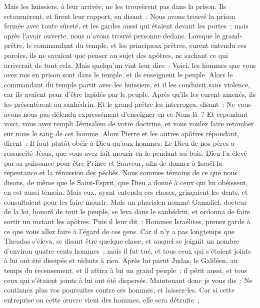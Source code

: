 \begin{multicols}{2}
Mais les huissiers, à leur arrivée, ne les trouvèrent pas dans la prison. Ils retournèrent, et firent leur rapport,
en disant~: Nous avons trouvé la prison fermée avec toute sûreté, et les gardes aussi qui étaient devant les portes~; mais après l'avoir ouverte, nous n'avons trouvé personne dedans.
Lorsque le grand-prêtre, le commandant du temple, et les principaux prêtres, eurent entendu ces paroles, ils ne savaient que penser au sujet des apôtres, ne sachant ce qui arriverait de tout cela.
Mais quelqu'un vint leur dire~: Voici, les hommes que vous avez mis en prison sont dans le temple, et ils enseignent le peuple.
Alors le commandant du temple partit avec les huissiers, et il les conduisit sans violence, car ils avaient peur d'être lapidés par le peuple.
Après qu'ils les eurent amenés, ils les présentèrent au sanhédrin. Et le grand-prêtre les interrogea, disant~:
Ne vous avons-nous pas défendu expressément d'enseigner en ce Nom-là~? Et cependant voici, vous avez rempli Jérusalem de votre doctrine, et vous voulez faire retomber sur nous le sang de cet homme.
Alors Pierre et les autres apôtres répondant, dirent~: Il faut plutôt obéir à Dieu qu'aux hommes.
Le Dieu de nos pères a ressuscité Jésus, que vous avez fait mourir en le pendant au bois.
Dieu l'a élevé par sa puissance pour être Prince et Sauveur, afin de donner à Israël la repentance et la rémission des péchés.
Nous sommes témoins de ce que nous disons, de même que le Saint-Esprit, que Dieu a donné à ceux qui lui obéissent, en est aussi témoin.
Mais eux, ayant entendu ces choses, grinçaient les dents, et consultaient pour les faire mourir.
Mais un pharisien nommé Gamaliel, docteur de la loi, honoré de tout le peuple, se leva dans le sanhédrin, et ordonna de faire sortir un instant les apôtres.
Puis il leur dit~: Hommes Israélites, prenez garde à ce que vous allez faire à l'égard de ces gens.
Car il n'y a pas longtemps que Theudas s'éleva, se disant être quelque chose, et auquel se joignit un nombre d'environ quatre cents hommes~; mais il fut tué, et tous ceux qui s'étaient joints à lui ont été dissipés et réduits à rien.
Après lui parut Judas, le Galiléen, au temps du recensement, et il attira à lui un grand peuple~; il périt aussi, et tous ceux qui s'étaient joints à lui ont été dispersés.
Maintenant donc je vous dis~: Ne continuez plus vos poursuites contre ces hommes, et laissez-les. Car si cette entreprise ou cette œuvre vient des hommes, elle sera détruite~;

\end{multicols}

